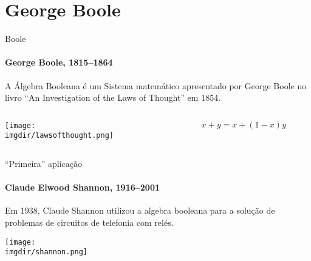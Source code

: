 



\section{George Boole}

\begin{frame}{Boole}
  \framesubtitle{George Boole, 1815--1864}

   A Álgebra Booleana é um Sistema matemático apresentado por George
    Boole no livro ``An Investigation of the Laws of Thought'' em
    1854.

  \begin{columns}
    \begin{column}{.5\textwidth}
    \texttt{[image: \\imgdir/lawsofthought.png]}
    \end{column}
    
    \begin{column}{.5\textwidth}
      $$ x + y = x + (1-x)y$$
    \end{column}

  \end{columns}

\end{frame}

\begin{frame}{``Primeira'' aplicação}
  \framesubtitle{Claude Elwood Shannon, 1916--2001}
 
     Em 1938, Claude Shannon utilizou a algebra booleana para a
    solução de problemas de circuitos de telefonia com relés.
 
  \texttt{[image: \\imgdir/shannon.png]}
\end{frame}

